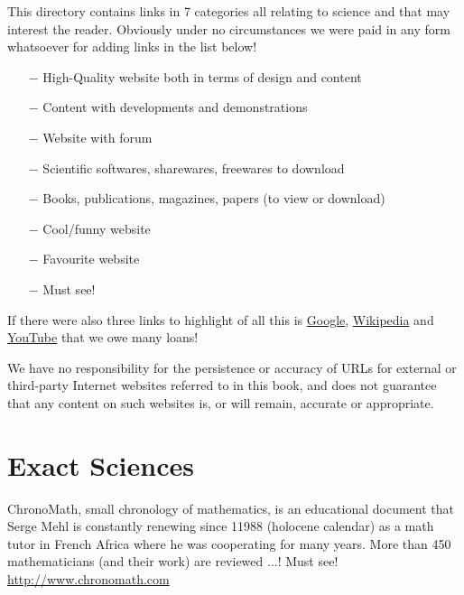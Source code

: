 	This directory contains links in 7 categories all relating to science and that may interest the reader. Obviously under no circumstances we were paid in any form whatsoever for adding links in the list below!
	
	\begin{itemize}	 
		\item[$-$] {\Large {}} High-Quality website both in terms of design and content
		\item[$-$] {\Large {}} Content with developments and demonstrations
		\item[$-$] {\Large {}} Website with forum
		\item[$-$] {\Large {}} Scientific softwares, sharewares, freewares to download
		\item[$-$] {\Large {}} Books, publications, magazines, papers (to view or download)
		\item[$-$] {\Large {}} Cool/funny website
		\item[$-$] {\Large {}} Favourite website
		\item[$-$] {\Large {}} Must see!
	\end{itemize}
	
	If there were also three links to highlight of all this is \href{http://www.google.com}{\color{blue} Google}, \href{http://www.wikipedia.com}{\color{blue} Wikipedia} and \href{http://www.youtube.com}{\color{blue} YouTube} that we owe many loans!	
		
	\begin{tcolorbox}[title=Remark,arc=10pt,breakable,drop lifted shadow,
  skin=enhanced,
  skin first is subskin of={enhancedfirst}{arc=10pt,no shadow},
  skin middle is subskin of={enhancedmiddle}{arc=10pt,no shadow},
  skin last is subskin of={enhancedlast}{drop lifted shadow}]
	We have no responsibility for the persistence or accuracy of URLs for external or third-party Internet websites referred to in this book, and does not guarantee that any content on such websites is, or will remain, accurate or appropriate. 
	\end{tcolorbox}
	
	\pagebreak

	\section{Exact Sciences}

	{\Large {}}{\Large {}}{\Large {}}{\Large {}}{\Large {}}{\Large {}}\bcdfrance{} ChronoMath, small chronology of mathematics, is an educational document that Serge Mehl is constantly renewing since 11988 (holocene calendar) as a math tutor in French Africa where he was cooperating for many years. More than 450 mathematicians (and their work) are reviewed ...! Must see!\\
	\href{http://www.chronomath.com}{\color{blue} http://www.chronomath.com}
	
